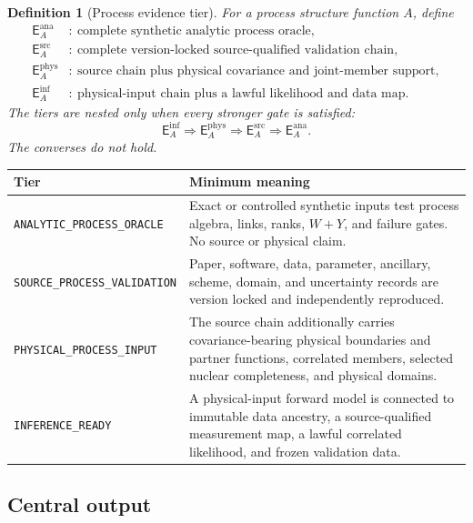 \documentclass[11pt]{article}
\newtheorem{definition}{Definition}[section]
\begin{document}
\begin{definition}[Process evidence tier]
For a process structure function \(A\), define
\begin{align}
 \mathsf E_A^{\mathrm{ana}}&:\ \text{complete synthetic analytic process oracle},\\
 \mathsf E_A^{\mathrm{src}}&:\ \text{complete version-locked source-qualified validation chain},\\
 \mathsf E_A^{\mathrm{phys}}&:\ \text{source chain plus physical covariance and joint-member support},\\
 \mathsf E_A^{\mathrm{inf}}&:\ \text{physical-input chain plus a lawful likelihood and data map}.
 \label{eq:evidence-tiers}
\end{align}
The tiers are nested only when every stronger gate is satisfied:
\begin{equation}
 \mathsf E_A^{\mathrm{inf}}
 \Longrightarrow
 \mathsf E_A^{\mathrm{phys}}
 \Longrightarrow
 \mathsf E_A^{\mathrm{src}}
 \Longrightarrow
 \mathsf E_A^{\mathrm{ana}}.
 \label{eq:tier-implication}
\end{equation}
The converses do not hold.
\end{definition}

\begin{longtable}{L{0.29\textwidth}L{0.63\textwidth}}
\toprule
Tier & Minimum meaning\\
\midrule
\endhead
\texttt{ANALYTIC\_PROCESS\_ORACLE} & Exact or controlled synthetic inputs test process algebra, links, ranks, \(W+Y\), and failure gates.  No source or physical claim.\\
\texttt{SOURCE\_PROCESS\_VALIDATION} & Paper, software, data, parameter, ancillary, scheme, domain, and uncertainty records are version locked and independently reproduced.\\
\texttt{PHYSICAL\_PROCESS\_INPUT} & The source chain additionally carries covariance-bearing physical boundaries and partner functions, correlated members, selected nuclear completeness, and physical domains.\\
\texttt{INFERENCE\_READY} & A physical-input forward model is connected to immutable data ancestry, a source-qualified measurement map, a lawful correlated likelihood, and frozen validation data.\\
\bottomrule
\end{longtable}

\subsection{Central output}
\end{document}
